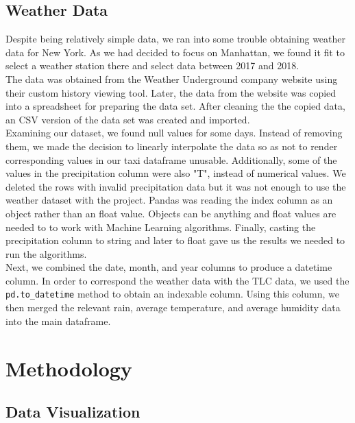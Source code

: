 \documentclass[journal, 12pt]{IEEEtran}
\newcommand{\cc}[1]{\texttt{#1}}
\begin{document}
\subsection{Weather Data}

\noindent Despite being relatively simple data, we ran into some trouble obtaining weather data for New York. As we had decided to focus on Manhattan, we found it fit to select a weather station there and select data between 2017 and 2018.\\

\noindent The data was obtained from the Weather Underground company website using their custom history viewing tool. Later, the data from the website was copied into a spreadsheet for preparing the data set. After cleaning the the copied data, an CSV version of the data set was created and imported. \\

\noindent Examining our dataset, we found null values for some days. Instead of removing them, we made the decision to linearly interpolate the data so as not to render corresponding values in our taxi dataframe unusable. Additionally, some of the values in the precipitation column were also "T", instead of numerical values. We deleted the rows with invalid precipitation data but it was not enough to use the weather dataset with the project. Pandas was reading the index column as an object rather than an float value. Objects can be anything and float values are needed to to work with Machine Learning algorithms. Finally, casting the precipitation column to string and later to float gave us the results we needed to run the algorithms.\\



\noindent Next, we combined the date, month, and year columns to produce a datetime column. In order to correspond the weather data with the TLC data, we used the \cc{pd.to\_datetime} method to obtain an indexable column. Using this column, we then merged  the relevant rain, average temperature, and average humidity data into the main dataframe.

\section{Methodology}

\subsection{Data Visualization}
\end{document}
